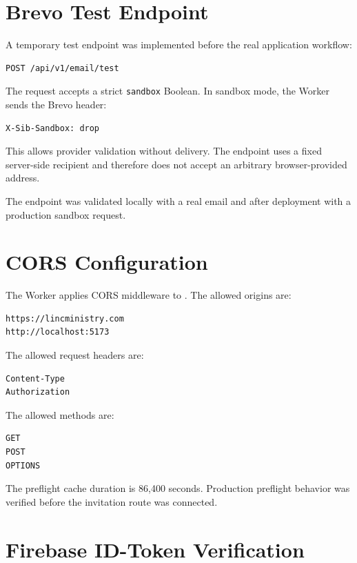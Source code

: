 \documentclass[11pt,a4paper,oneside]{report}
\begin{document}
\section{Brevo Test Endpoint}

A temporary test endpoint was implemented before the real application workflow:

\begin{lstlisting}
POST /api/v1/email/test
\end{lstlisting}

The request accepts a strict \texttt{sandbox} Boolean. In sandbox mode, the Worker sends the Brevo header:

\begin{lstlisting}
X-Sib-Sandbox: drop
\end{lstlisting}

This allows provider validation without delivery. The endpoint uses a fixed server-side recipient and therefore does not accept an arbitrary browser-provided address.

The endpoint was validated locally with a real email and after deployment with a production sandbox request.

\section{CORS Configuration}

The Worker applies CORS middleware to . The allowed origins are:

\begin{lstlisting}
https://lincministry.com
http://localhost:5173
\end{lstlisting}

The allowed request headers are:

\begin{lstlisting}
Content-Type
Authorization
\end{lstlisting}

The allowed methods are:

\begin{lstlisting}
GET
POST
OPTIONS
\end{lstlisting}

The preflight cache duration is 86,400 seconds. Production preflight behavior was verified before the invitation route was connected.

\section{Firebase ID-Token Verification}
\end{document}
